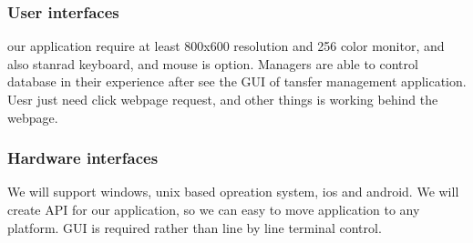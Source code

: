 
\subsubsection{User interfaces}
our application require at least 800x600 resolution and 256 color monitor, and also stanrad keyboard, and mouse is option.
Managers are able to control database in their experience after see the GUI of tansfer management application.
Uesr just need click webpage request, and other things is working behind the webpage.


\subsubsection{Hardware interfaces}
We will support windows, unix based opreation system, ios and android.
We will create API for our application, so we can easy to move application to any platform.
GUI is required rather than line by line terminal control.


